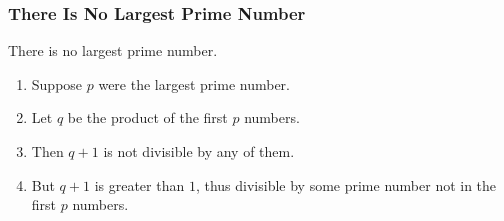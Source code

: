 \documentclass[aspectratio=169,10pt,handout]{beamer}
\begin{document}
   
   \maketitle
   
\begin{frame} 
\frametitle{There Is No Largest Prime Number} 
\begin{theorem}
There is no largest prime number. 
\end{theorem} 
\begin{enumerate} 
\item Suppose $p$ were the largest prime number. 
\item Let $q$ be the product of the first $p$ numbers. 
\item Then $q+1$ is not divisible by any of them. 
\item But $q + 1$ is greater than $1$, thus divisible by some prime
number not in the first $p$ numbers.
\end{enumerate}
\end{frame}

\begin{frame}[t]
\end{frame}
\end{document}
